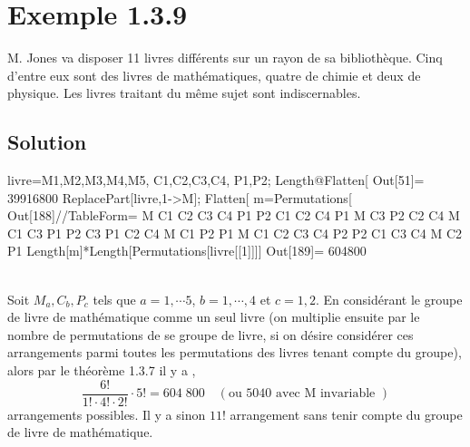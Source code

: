\section*{Exemple 1.3.9}
M. Jones va disposer 11 livres différents sur un rayon de sa bibliothèque. Cinq d'entre eux sont des livres de mathématiques, quatre de chimie et deux de physique. Les livres traitant du même sujet sont indiscernables.
\subsection*{Solution}
\begin{multicols}{2}
\begin{verbbox}
livre={{M1,M2,M3,M4,M5},
	{C1,C2,C3,C4},
	{P1,P2}};
Length@Flatten[%
Out[51]= 39916800
ReplacePart[livre,1->M];
Flatten[%
m=Permutations[%
Out[188]//TableForm= M	C1	C2	C3	C4	P1	P2
C1	C2	C4	P1	M	C3	P2
C2	C4	M	C1	C3	P1	P2
C3	P1	C2	C4	M	C1	P2
P1	M	C1	C2	C3	C4	P2
P2	C1	C3	C4	M	C2	P1
Length[m]*Length[Permutations[livre[[1]]]]
Out[189]= 604800
\end{verbbox}
	\theverbbox
	\columnbreak
	\\
	Soit $M_a,C_b,P_c$ tels que $a=1,\cdots 5$, $b=1,\cdots,4$ et $c=1,2$. En considérant le groupe de livre de mathématique comme un seul livre (on multiplie ensuite par le nombre de permutations de se groupe de livre, si on désire considérer ces arrangements parmi toutes les permutations des livres tenant compte du groupe), alors par le théorème 1.3.7 il y a ,
	\begin{equation*}
	\frac{6!}{1!\cdot 4!\cdot 2!}\cdot 5! = 604\;800\quad (\text{ou $5040$ avec M invariable })
	\end{equation*}
	arrangements possibles. Il y a sinon $11!$ arrangement sans tenir compte du groupe de livre de mathématique.
\end{multicols}